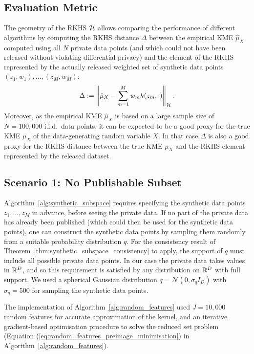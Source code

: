 \subsection{Evaluation Metric}

The geometry of the RKHS $\mathcal{H}$ allows comparing the performance of different algorithms by computing the RKHS distance $\Delta$ between the empirical KME $\hat{\mu}_X$ computed using all $N$ private data points (and which could not have been released without violating differential privacy) and the element of the RKHS represented by the actually released weighted set of synthetic data points $(z_1, w_1), \ldots, (z_M, w_M)$:
\begin{equation*}
\Delta := \left\| \hat{\mu}_X - \sum_{m = 1}^M w_m k(z_m, \cdot) \right\|_{\mathcal{H}}
.
\end{equation*}
Moreover, as the empirical KME $\hat{\mu}_X$ is based on a large sample size of $N = 100,000$ i.i.d.~data points, it can be expected to be a good proxy for the true KME $\mu_X$ of the data-generating random variable $X$. In that case $\Delta$ is also a good proxy for the RKHS distance between the true KME $\mu_X$ and the RKHS element represented by the released dataset.


\subsection{Scenario 1: No Publishable Subset}
\label{sec:experiments:nodata}

Algorithm~\ref{alg:synthetic_subspace} requires specifying the synthetic data points $z_1, \ldots, z_M$ in advance, before seeing the private data. If no part of the private data has already been published (which could then be used for the synthetic data points), one can construct the synthetic data points by sampling them randomly from a suitable probability distribution $q$. For the consistency result of Theorem~\ref{thm:synthetic_subspace_consistency} to apply, the support of $q$ must include all possible private data points. In our case the private data takes values in $\mathbb{R}^D$, and so this requirement is satisfied by any distribution on $\mathbb{R}^D$ with full support. We used a spherical Gaussian distribution $q = \mathcal{N}(0, \sigma_q I_D)$ with $\sigma_q = 500$ for sampling the synthetic data points.

The implementation of Algorithm~\ref{alg:random_features} used $J = 10,000$ random features for accurate approximation of the kernel, and an iterative gradient-based optimisation procedure to solve the reduced set problem (Equation (\ref{eq:random_features_preimage_minimisation}) in Algorithm~\ref{alg:random_features}).

